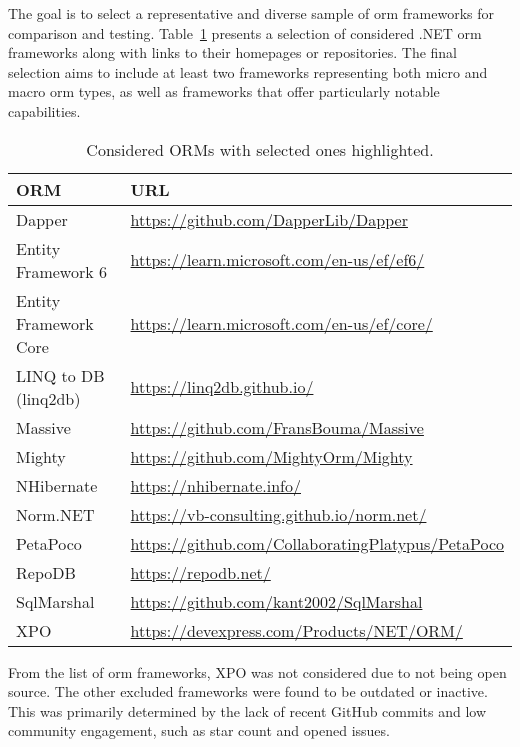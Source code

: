 The goal is to select a representative and diverse sample of \acrshort{orm} frameworks for comparison and testing. Table~\ref{tab:orm-docs} presents a selection of considered .NET \acrshort{orm} frameworks along with links to their homepages or repositories. The final selection aims to include at least two frameworks representing both micro and macro \acrshort{orm} types, as well as frameworks that offer particularly notable capabilities.

\begin{table}[ht!]
\footnotesize
\def\arraystretch{1.25}
\centering
\begin{tabular}{ll}
\toprule
\textbf{ORM} & \textbf{URL} \\
\midrule
\cellcolor{lightgreen}Dapper & \url{https://github.com/DapperLib/Dapper} \\
\cellcolor{lightgreen}Entity Framework 6 & \url{https://learn.microsoft.com/en-us/ef/ef6/} \\
\cellcolor{lightgreen}Entity Framework Core & \url{https://learn.microsoft.com/en-us/ef/core/} \\
\cellcolor{lightgreen}LINQ to DB (linq2db) & \url{https://linq2db.github.io/} \\
Massive & \url{https://github.com/FransBouma/Massive} \\
Mighty & \url{https://github.com/MightyOrm/Mighty} \\
\cellcolor{lightgreen}NHibernate & \url{https://nhibernate.info/} \\
Norm.NET & \url{https://vb-consulting.github.io/norm.net/} \\
\cellcolor{lightgreen}PetaPoco & \url{https://github.com/CollaboratingPlatypus/PetaPoco} \\
\cellcolor{lightgreen}RepoDB & \url{https://repodb.net/} \\
SqlMarshal & \url{https://github.com/kant2002/SqlMarshal} \\
XPO & \url{https://devexpress.com/Products/NET/ORM/} \\
\bottomrule
\end{tabular}
\caption{Considered ORMs with selected ones highlighted.\label{tab:orm-docs}}
\end{table}

From the list of \acrshort{orm} frameworks, XPO was not considered due to not being open source. The other excluded frameworks were found to be outdated or inactive. This was primarily determined by the lack of recent GitHub commits and low community engagement, such as star count and opened issues. 


